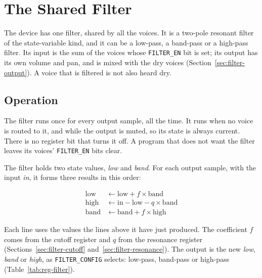 \chapter{The Shared Filter}
\label{ch:filter}

The device has one filter, shared by all the voices. It is a two-pole resonant filter of the state-variable kind, and
it can be a low-pass, a band-pass or a high-pass filter. Its input is the sum of the voices whose \texttt{FILTER\_EN}
bit is set; its output has its own volume and pan, and is mixed with the dry voices (Section~\ref{sec:filter-output}).
A voice that is filtered is not also heard dry.

\section{Operation}

The filter runs once for every output sample, all the time. It runs when no voice is routed to it, and while the output
is muted, so its state is always current. There is no register bit that turns it off. A program that does not want the
filter leaves its voices' \texttt{FILTER\_EN} bits clear.

The filter holds two state values, \emph{low} and \emph{band}. For each output sample, with the input \emph{in}, it
forms three results in this order:

\begin{align*}
	\mathrm{low}  & \leftarrow \mathrm{low} + f \times \mathrm{band}               \\
	\mathrm{high} & \leftarrow \mathrm{in} - \mathrm{low} - q \times \mathrm{band} \\
	\mathrm{band} & \leftarrow \mathrm{band} + f \times \mathrm{high}
\end{align*}

\noindent Each line uses the values the lines above it have just produced. The coefficient $f$ comes from the cutoff register
and $q$ from the resonance register (Sections~\ref{sec:filter-cutoff} and~\ref{sec:filter-resonance}). The output is
the new \emph{low}, \emph{band} or \emph{high}, as \texttt{FILTER\_CONFIG} selects: low-pass, band-pass or high-pass
(Table~\ref{tab:reg-filter}).

